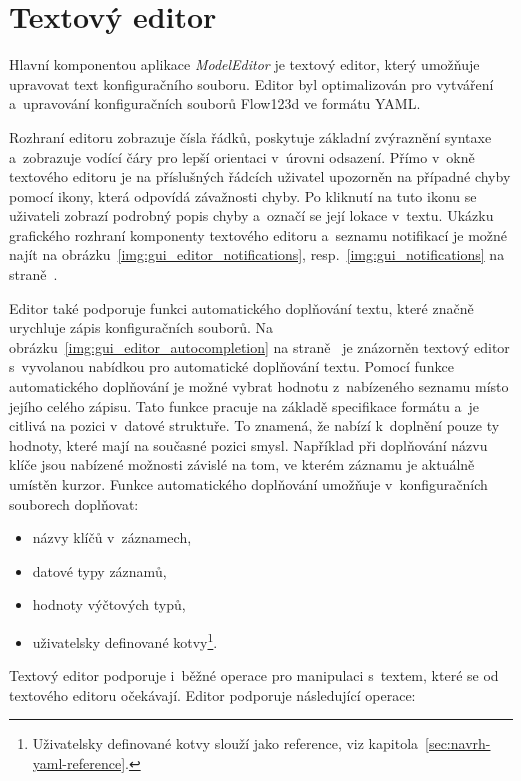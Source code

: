 \documentclass[FM,bw,DP]{tulthesis}
\begin{document}
\clearpage

\section{Textový editor}

Hlavní komponentou aplikace \textit{ModelEditor} je textový editor, který umožňuje upravovat text konfiguračního souboru. Editor byl optimalizován pro vytváření a~upravování konfiguračních souborů Flow123d ve formátu \gls{YAML}.

Rozhraní editoru zobrazuje čísla řádků, poskytuje základní zvýraznění syntaxe a~zobrazuje vodící čáry pro lepší orientaci v~úrovni odsazení. Přímo v~okně textového editoru je na příslušných řádcích uživatel upozorněn na případné chyby pomocí ikony, která odpovídá závažnosti chyby. Po kliknutí na tuto ikonu se uživateli zobrazí podrobný popis chyby a~označí se její lokace v~textu. Ukázku grafického rozhraní komponenty textového editoru a~seznamu notifikací je možné najít na obrázku~\ref{img:gui_editor_notifications}, resp.~\ref{img:gui_notifications} na straně~\pageref{img:gui_editor_notifications}. 

Editor také podporuje funkci automatického doplňování textu, které značně urychluje zápis konfiguračních souborů. Na obrázku~\ref{img:gui_editor_autocompletion} na straně~\pageref{img:gui_editor_autocompletion} je znázorněn textový editor s~vyvolanou nabídkou pro automatické doplňování textu. Pomocí funkce automatického doplňování je možné vybrat hodnotu z~nabízeného seznamu místo jejího celého zápisu. Tato funkce pracuje na základě specifikace formátu a~je citlivá na pozici v~datové struktuře. To znamená, že nabízí k~doplnění pouze ty hodnoty, které mají na současné pozici smysl. Například při doplňování názvu klíče jsou nabízené možnosti závislé na tom, ve kterém záznamu je aktuálně umístěn kurzor. Funkce automatického doplňování umožňuje v~konfiguračních souborech doplňovat:

\begin{itemize}
\item názvy klíčů v~záznamech,
\item datové typy záznamů,
\item hodnoty výčtových typů,
\item uživatelsky definované kotvy\footnote{Uživatelsky definované kotvy slouží jako reference, viz kapitola~\ref{sec:navrh-yaml-reference}.}.
\end{itemize}

Textový editor podporuje i~běžné operace pro manipulaci s~textem, které se od textového editoru očekávají. Editor podporuje následující operace:
\end{document}
